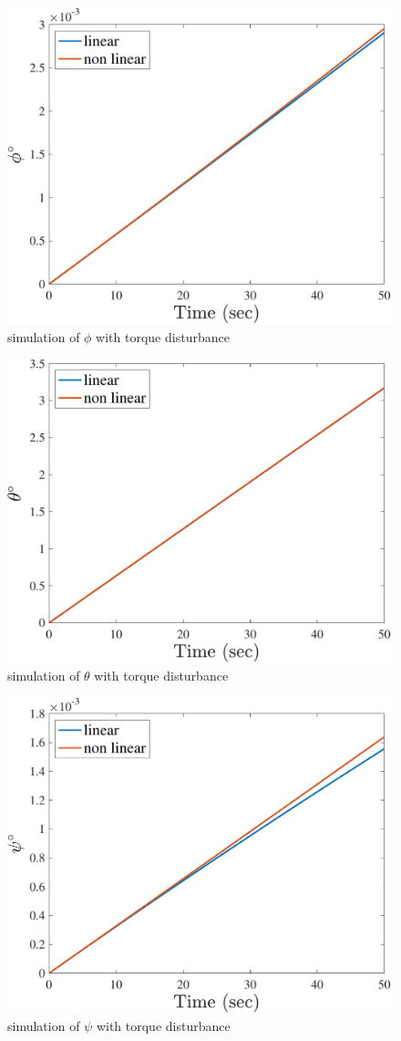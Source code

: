 \begin{figure}[H]
    \caption{simulation of $\phi$ with torque disturbance}
    \centering
    \includegraphics[width=12cm]{../Figure/Q2/phi_part_d}
\end{figure}

\begin{figure}[H]
    \caption{simulation of $\theta$ with torque disturbance}
    \centering
    \includegraphics[width=12cm]{../Figure/Q2/theta_part_d}
\end{figure}

\begin{figure}[H]
    \caption{simulation of $\psi$ with torque disturbance}
    \centering
    \includegraphics[width=12cm]{../Figure/Q2/psi_part_d}
\end{figure}

